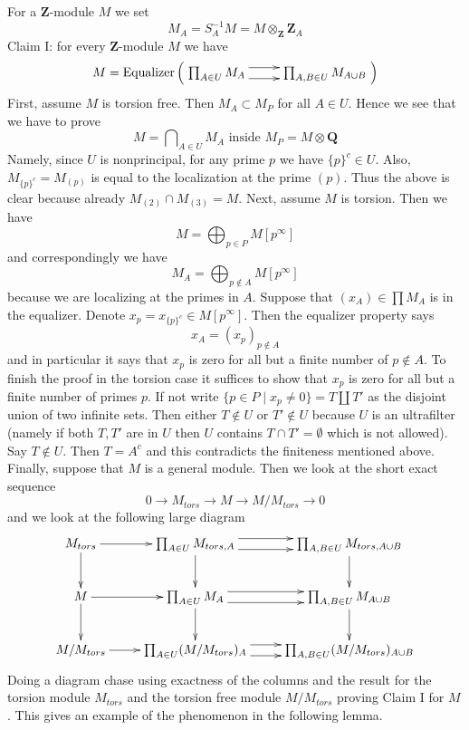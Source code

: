 \medskip\noindent
For a $\mathbf{Z}$-module $M$ we set
$$
M_A = S_A^{-1}M = M \otimes_{\mathbf{Z}} \mathbf{Z}_A
$$
Claim I: for every $\mathbf{Z}$-module $M$ we have
$$
M =
\text{Equalizer}\left(
\xymatrix{
\prod\nolimits_{A \in U} M_A \ar@<1ex>[r] \ar@<-1ex>[r] &
\prod\nolimits_{A, B \in U} M_{A \cup B}
}
\right)
$$
First, assume $M$ is torsion free. Then $M_A \subset M_P$ for all $A \in U$.
Hence we see that we have to prove
$$
M = \bigcap\nolimits_{A \in U} M_A\text{ inside }M_P = M \otimes \mathbf{Q}
$$
Namely, since $U$ is nonprincipal, for any prime $p$ we have
$\{p\}^c \in U$. Also, $M_{\{p\}^c} = M_{(p)}$ is equal to the
localization at the prime $(p)$.
Thus the above is clear because already $M_{(2)} \cap M_{(3)} = M$.
Next, assume $M$ is torsion. Then we have
$$
M = \bigoplus\nolimits_{p \in P} M[p^\infty]
$$
and correspondingly we have
$$
M_A = \bigoplus\nolimits_{p \not \in A} M[p^\infty]
$$
because we are localizing at the primes in $A$. Suppose that
$(x_A) \in \prod M_A$ is in the equalizer. Denote
$x_p = x_{\{p\}^c} \in M[p^{\infty}]$. Then the equalizer
property says
$$
x_A = (x_p)_{p \not \in A}
$$
and in particular it says that $x_p$ is zero for all but a finite
number of $p \not \in A$. To finish the proof in the torsion case
it suffices to show that $x_p$ is zero for all but a finite number
of primes $p$. If not write $\{p \in P \mid x_p \not = 0\} = T \amalg T'$
as the disjoint union of two infinite sets. Then either
$T \not \in U$ or $T' \not \in U$ because $U$ is an ultrafilter
(namely if both $T, T'$ are in $U$ then $U$ contains $T \cap T' = \emptyset$
which is not allowed). Say $T \not \in U$. Then $T = A^c$ and this
contradicts the finiteness mentioned above.
Finally, suppose that $M$ is a general module. Then we look
at the short exact sequence
$$
0 \to M_{tors} \to M \to M/M_{tors} \to 0
$$
and we look at the following large diagram
$$
\xymatrix{
M_{tors} \ar[r] \ar[d] &
\prod\nolimits_{A \in U} M_{tors, A} \ar@<1ex>[r] \ar@<-1ex>[r] \ar[d] &
\prod\nolimits_{A, B \in U} M_{tors, A \cup B} \ar[d] \\
M \ar[r] \ar[d] &
\prod\nolimits_{A \in U} M_A \ar@<1ex>[r] \ar@<-1ex>[r] \ar[d] &
\prod\nolimits_{A, B \in U} M_{A \cup B} \ar[d] \\
M/M_{tors} \ar[r] &
\prod\nolimits_{A \in U} (M/M_{tors})_A \ar@<1ex>[r] \ar@<-1ex>[r] &
\prod\nolimits_{A, B \in U} (M/M_{tors})_{A \cup B} \\
}
$$
Doing a diagram chase using exactness of the columns and the result
for the torsion module $M_{tors}$ and the torsion free module
$M/M_{tors}$ proving Claim I for $M$.
This gives an example of the phenomenon in the following lemma.

